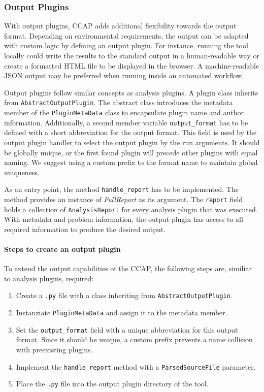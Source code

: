 \subsubsection{Output Plugins}
With output plugins, CCAP adds additional flexibility towards the output format. Depending on environmental requirements, the output can be adapted with custom logic by defining an output plugin. For instance, running the tool locally could write the results to the standard output in a human-readable way or create a formatted HTML file to be displayed in the browser. A machine-readable JSON output may be preferred when running inside an automated workflow.

Output plugins follow similar concepts as analysis plugins. A plugin class inherits from \texttt{AbstractOutputPlugin}. The abstract class introduces the metadata member of the \texttt{PluginMetaData} class to encapsulate plugin name and author information. Additionally, a second member variable \texttt{output\_format} has to be defined with a short abbreviation for the output format. This field is used by the output plugin handler to select the output plugin by the run arguments. It should be globally unique, or the first found plugin will precede other plugins with equal naming. We suggest using a custom prefix to the format name to maintain global uniqueness.

As an entry point, the method \texttt{handle\_report} has to be implemented. The method provides an instance of \textit{FullReport} as its argument. The \texttt{report} field holds a collection of \texttt{AnalysisReport} for every analysis plugin that was executed. With metadata and problem information, the output plugin has access to all required information to produce the desired output.

\paragraph{Steps to create an output plugin}
To extend the output capabilities of the CCAP, the following steps are, similiar to analysis plugins, required:
\begin{enumerate}
    \item Create a \texttt{.py} file with a class inheriting from \texttt{AbstractOutputPlugin}.
    \item Instanziate \texttt{PluginMetaData} and assign it to the metadata member.
    \item Set the \texttt{output\_format} field with a unique abbreviation for this output format. Since it should be unique, a custom prefix prevents a name collision with preexisting plugins.
    \item Implement the \texttt{handle\_report} method with a \texttt{ParsedSourceFile} parameter. 
    \item Place the \texttt{.py} file into the output plugin directory of the tool.
\end{enumerate}

